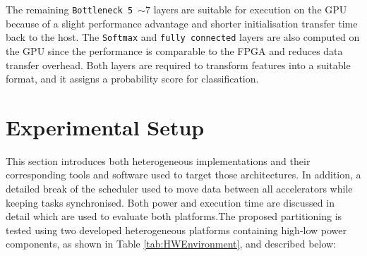 The remaining \texttt{Bottleneck 5 $\sim 7$} layers are suitable for execution on the GPU because of a slight performance advantage and shorter initialisation transfer time back to the host. The \texttt{Softmax} and \texttt{fully connected} layers are also computed on the GPU since the performance is comparable to the FPGA and reduces data transfer overhead. Both layers are required to transform features into a suitable format, and it assigns a probability score for classification. 



\section{Experimental Setup}
This section introduces both heterogeneous implementations and their corresponding tools and software used to target those architectures. In addition, a detailed break of the scheduler used to move data between all accelerators while keeping tasks synchronised. Both power and execution time are discussed in detail which are used to evaluate both platforms.The proposed partitioning is tested using two developed heterogeneous platforms containing high-low power components, as shown in Table \ref{tab:HWEnvironment}, and described below:

 


